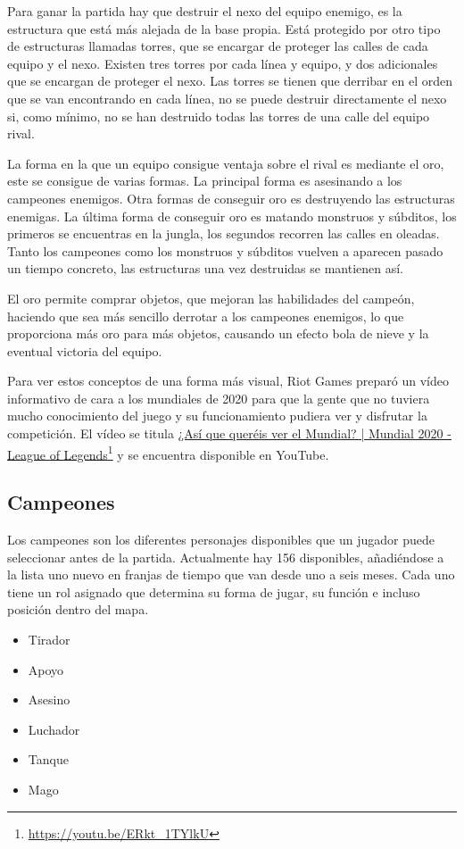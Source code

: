 Para ganar la partida hay que destruir el nexo del equipo enemigo, es la estructura que está más alejada de la base propia. Está protegido por otro tipo de estructuras llamadas torres, que se encargar de proteger las calles de cada equipo y el nexo. Existen tres torres por cada línea y equipo, y dos adicionales que se encargan de proteger el nexo. Las torres se tienen que derribar en el orden que se van encontrando en cada línea, no se puede destruir directamente el nexo si, como mínimo, no se han destruido todas las torres de una calle del equipo rival.

La forma en la que un equipo consigue ventaja sobre el rival es mediante el oro, este se consigue de varias formas. La principal forma es asesinando a los campeones enemigos. Otra formas de conseguir oro es destruyendo las estructuras enemigas. La última forma de conseguir oro es matando monstruos y súbditos, los primeros se encuentras en la jungla, los segundos recorren las calles en oleadas. Tanto los campeones como los monstruos y súbditos vuelven a aparecen pasado un tiempo concreto, las estructuras una vez destruidas se mantienen así.

El oro permite comprar objetos, que mejoran las habilidades del campeón, haciendo que sea más sencillo derrotar a los campeones enemigos, lo que proporciona más oro para más objetos, causando un efecto bola de nieve y la eventual victoria del equipo.

Para ver estos conceptos de una forma más visual, Riot Games preparó un vídeo informativo de cara a los mundiales de 2020 para que la gente que no tuviera mucho conocimiento del juego y su funcionamiento pudiera ver y disfrutar la competición. El vídeo se titula \href{https://www.youtube.com/watch?v=ERkt_1TYlkU}{¿Así que queréis ver el Mundial? | Mundial 2020 - League of Legends}\footnote{\url{https://youtu.be/ERkt_1TYlkU}} y se encuentra disponible en YouTube.


\subsection{Campeones}
Los campeones son los diferentes personajes disponibles que un jugador puede seleccionar antes de la partida. Actualmente hay 156 disponibles, añadiéndose a la lista uno nuevo en franjas de tiempo que van desde uno a seis meses. Cada uno tiene un rol asignado que determina su forma de jugar, su función e incluso posición dentro del mapa.
\begin{itemize}
	\tightlist
	\item Tirador
	\item Apoyo
	\item Asesino
	\item Luchador
	\item Tanque
	\item Mago
\end{itemize}

